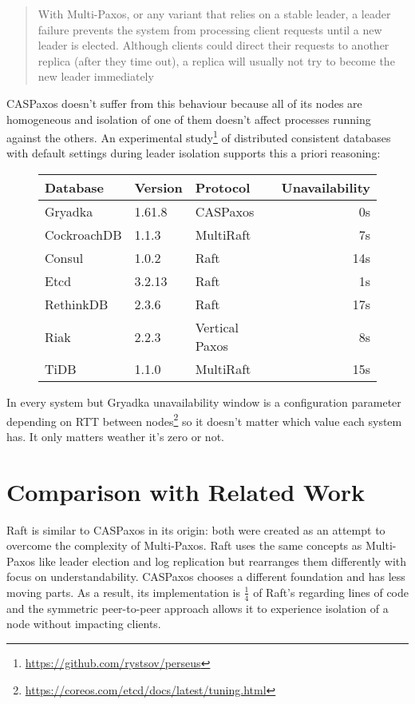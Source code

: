 \documentclass[12pt]{article}
\theoremstyle{definition}
\begin{document}
\begin{quote}
  With Multi-Paxos, or any variant that relies on a stable leader, a leader failure prevents the system from processing client requests until a new leader is elected. Although clients could direct their requests to another replica (after they time out), a replica will usually not try to become the new leader immediately
\end{quote}

CASPaxos doesn't suffer from this behaviour because all of its nodes are homogeneous and isolation of one of them doesn't affect processes running against the others. An experimental study\footnote{\href{https://github.com/rystsov/perseus}{https://github.com/rystsov/perseus}} of distributed consistent databases with default settings during leader isolation supports this a priori reasoning:

\begin{figure}[!h]
  \centering
  \begin{tabular}{|l|l|l|r|}
  \hline
  Database & Version & Protocol & Unavailability\\
  \hline
  \hline
  Gryadka & 1.61.8 & CASPaxos & 0s\\
  \hline
  CockroachDB & 1.1.3 & MultiRaft & 7s\\
  Consul & 1.0.2 & Raft & 14s\\
  Etcd & 3.2.13 & Raft & 1s\\
  RethinkDB & 2.3.6 & Raft & 17s\\
  Riak & 2.2.3 & Vertical Paxos & 8s\\
  TiDB & 1.1.0 & MultiRaft & 15s\\
  \hline
  \end{tabular}
\end{figure}

In every system but Gryadka unavailability window is a configuration parameter depending on RTT between nodes\footnote{\href{https://coreos.com/etcd/docs/latest/tuning.html}{https://coreos.com/etcd/docs/latest/tuning.html}} so it doesn't matter which value each system has. It only matters weather it's zero or not.

\section{Comparison with Related Work}

Raft\cite{raft} is similar to CASPaxos in its origin: both were created as an attempt to overcome the complexity of Multi-Paxos. Raft uses the same concepts as Multi-Paxos like leader election and log replication but rearranges them differently with focus on understandability. CASPaxos chooses a different foundation and has less moving parts. As a result, its implementation is $\frac{1}{4}$ of Raft's regarding lines of code and the symmetric peer-to-peer approach allows it to experience isolation of a node without impacting clients.
\end{document}
